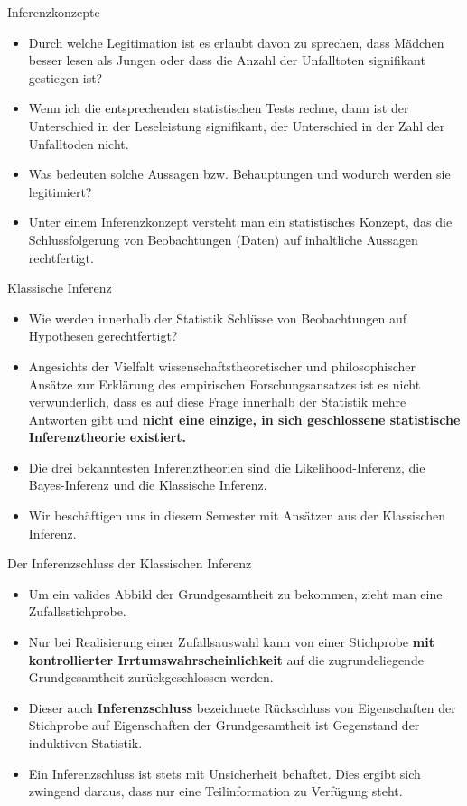 \documentclass[usenames,dvipsnames,handout]{beamer}
\begin{document}
\begin{frame}{Inferenzkonzepte}
\begin{itemize}
\item{Durch welche Legitimation ist es erlaubt davon zu sprechen, dass Mädchen besser lesen als Jungen oder dass die Anzahl der Unfalltoten signifikant gestiegen ist?}\pause
\item{Wenn ich die entsprechenden statistischen Tests rechne, dann ist der Unterschied in der Leseleistung signifikant, der Unterschied in der Zahl der Unfalltoden nicht.}\pause
\item{Was bedeuten solche Aussagen bzw. Behauptungen und wodurch werden sie legitimiert?}\pause
\item{Unter einem Inferenzkonzept versteht man ein statistisches Konzept, das die Schlussfolgerung von Beobachtungen (Daten) auf inhaltliche Aussagen rechtfertigt.}
\end{itemize}
\end{frame}



\begin{frame}{Klassische Inferenz}
\begin{itemize}
\item{Wie werden innerhalb der Statistik Schlüsse von Beobachtungen auf Hypothesen gerechtfertigt?}\pause
\item{Angesichts der Vielfalt wissenschaftstheoretischer und philosophischer Ansätze zur Erklärung des empirischen Forschungsansatzes
ist es nicht verwunderlich, dass es auf diese Frage innerhalb der Statistik mehre Antworten gibt und 
\textbf{nicht eine einzige, in sich geschlossene statistische Inferenztheorie
existiert. }}\pause%
\item{Die drei bekanntesten Inferenztheorien sind die Likelihood-Inferenz, die Bayes-Inferenz und die Klassische Inferenz.}
\item{Wir beschäftigen uns in diesem Semester mit Ansätzen aus der Klassischen Inferenz.}
\end{itemize}
\end{frame}
\begin{frame}{Der Inferenzschluss der Klassischen Inferenz}
\begin{itemize}
\item{Um ein valides  Abbild der Grundgesamtheit zu bekommen,
zieht man eine Zufallsstichprobe.}
\item{Nur bei Realisierung einer Zufallsauswahl kann von einer Stichprobe
\textbf{mit kontrollierter Irrtumswahrscheinlichkeit} auf die zugrundeliegende
Grundgesamtheit zurückgeschlossen werden. }
\item{Dieser auch \textbf{Inferenzschluss} bezeichnete Rückschluss
von Eigenschaften der Stichprobe auf Eigenschaften der Grundgesamtheit ist
Gegenstand der induktiven Statistik.}
\item{Ein Inferenzschluss ist stets mit Unsicherheit behaftet. Dies ergibt sich
zwingend daraus, dass nur eine Teilinformation zu Verfügung steht.}
\end{itemize}
\end{frame}
\end{document}
